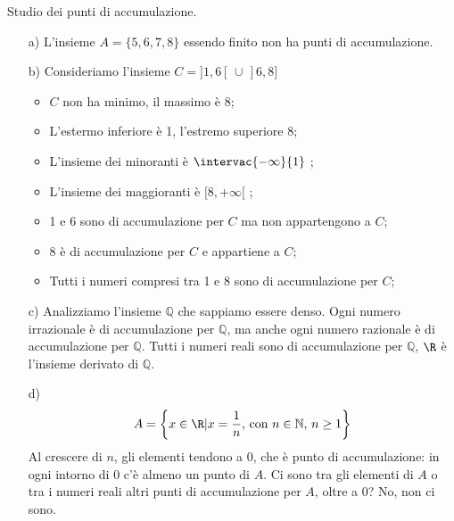 \begin{esempio}
Studio dei punti di accumulazione.
\begin{itemize}
\item[a)] L'insieme \(A=\{ 5,6,7,8\}\) essendo finito non ha punti di 
accumulazione.
\item[b)] Consideriamo l'insieme \(C=]1,6[\,\cup\,]6,8]\)
\begin{itemize} [noitemsep]
\item \(C\) non ha minimo, il massimo è 8;
\item L'estermo inferiore è 1, l'estremo superiore 8;
\item L'insieme dei minoranti è \(\intervac{-\infty}{1}\) ;
\item L'insieme dei maggioranti è \([8,+\infty[\) ;
\item 1 e 6 sono di accumulazione per \(C\) ma non 
appartengono a \(C\);
\item 8 è di accumulazione per \(C\) e appartiene a \(C\);
\item Tutti i numeri compresi tra 1 e 8 sono di 
accumulazione per \(C\);
\end{itemize}
\item[c)] Analizziamo l'insieme \(\mathbb{Q}\) che sappiamo essere 
denso. Ogni numero irrazionale è di accumulazione per \(\mathbb{Q}\), ma anche 
ogni numero razionale è di accumulazione per \(\mathbb{Q}\). Tutti i numeri 
reali sono di accumulazione per \(\mathbb{Q}\), \(\R\) è l'insieme 
derivato di \(\mathbb{Q}\).
\item[d)] \[A=\biggl\{ x\in\R \vert x=\frac{1}{n}, 
\,\text{con}\,\, n\in\mathbb{N},\,n\geq1 \biggr\}\]
Al crescere di \(n\), gli elementi tendono a 0, che è punto di accumulazione: 
in ogni intorno di 0 c'è almeno un punto di \(A\). Ci sono tra gli elementi di 
\(A\) o tra i numeri reali altri punti di accumulazione per \(A\), oltre a 0? 
No, non ci sono.
\end{itemize}
\end{esempio}









